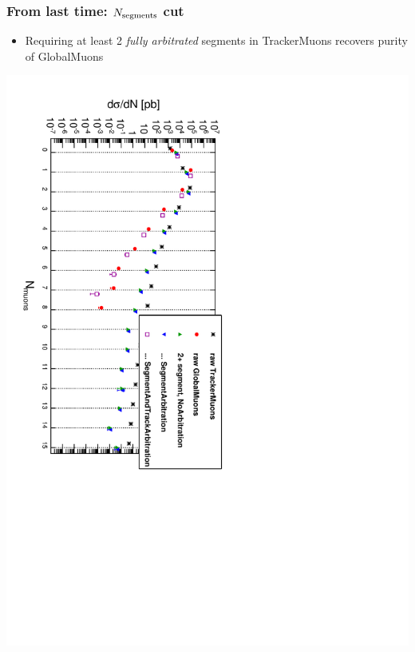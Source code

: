 \documentclass[compress]{beamer}
\newcommand{\s}[1]{{\mbox{\scriptsize #1}}}
\begin{document}
\begin{frame}
\frametitle{From last time: $N_\s{segments}$ cut}

\begin{itemize}
\item Requiring at least 2 {\it fully arbitrated} segments in TrackerMuons recovers purity of GlobalMuons
\end{itemize}

\includegraphics[height=\linewidth, angle=90]{tracks_lastpage_allreal.pdf}
\end{frame}
\end{document}
